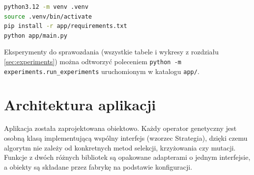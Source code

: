 \documentclass[11pt,a4paper]{article}
\begin{document}
\begin{lstlisting}[language=bash]
python3.12 -m venv .venv
source .venv/bin/activate
pip install -r app/requirements.txt
python app/main.py
\end{lstlisting}

Eksperymenty do sprawozdania (wszystkie tabele i wykresy z rozdziału \ref{sec:experiments})
można odtworzyć poleceniem \texttt{python -m experiments.run\_experiments} uruchomionym w katalogu \texttt{app/}.

\section{Architektura aplikacji}

Aplikacja została zaprojektowana obiektowo. Każdy operator genetyczny jest osobną klasą
implementującą wspólny interfejs (wzorzec Strategia), dzięki czemu algorytm nie zależy od
konkretnych metod selekcji, krzyżowania czy mutacji. Funkcje z dwóch różnych bibliotek są
opakowane adapterami o jednym interfejsie, a obiekty są składane przez fabrykę na podstawie
konfiguracji.
\end{document}
